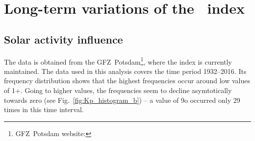 \section{Long-term variations of the \Kp{}~index}
\label{sec:long_term_variations}

\subsection{Solar activity influence}
The \Kp{} data is obtained from the GFZ~Potsdam\footnote{GFZ~Potsdam website: }, where the index is currently maintained. The data used in this analysis covers the time period 1932--2016. Its frequency distribution shows that the highest frequencies occur around low \Kp{} values of 1+. Going to higher \Kp{} values, the frequencies seem to decline asymtotically towards zero (see Fig.~\ref{fig:Kp_histogram_b}) -- a \Kp{} value of 9o occurred only 29 times in this time interval.\\
